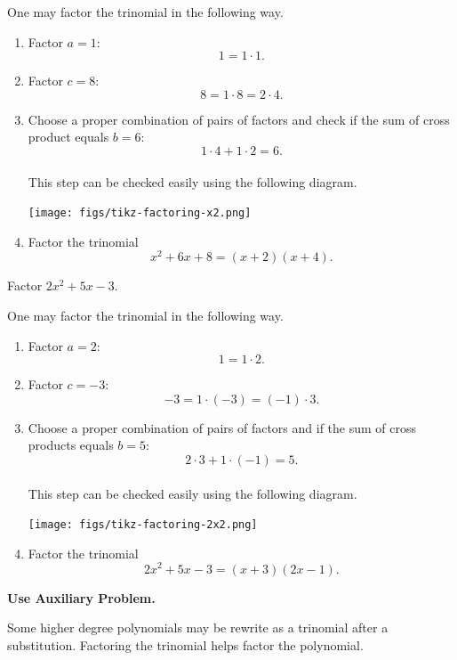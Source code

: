 \documentclass[
  en,11pt]{elegantbook}
\newcommand{\size}[2]{{\fontsize{#1}{0}\selectfont#2}}
\renewenvironment{example}[1][]{
  \refstepcounter{exam}
  \par\noindent\textbf{\color{main}{\examplename} \theexam #1}
  \rmfamily
}{
  \par\ignorespacesafterend
}
\newenvironment{rmdtip}{
	\vspace*{0.5\baselineskip}
	\par\noindent
	\makebox[-3pt][r]{\color{red!90}\size{12}{\HandRight}\,\,}
    \begin{tcolorbox}[
    enhanced,
    title={\textbf{\color{second}Tips}},
    title style={left color=blue!10!green!20!white,right color=yellow!20!blue!20!white},
    colback=cyan!10!white,
    ]
    \sffamily
}{
    \end{tcolorbox}
    \par\ignorespacesafterend
}
\begin{document}
\begin{solution}

One may factor the trinomial in the following way.

\begin{enumerate}
\def\labelenumi{\arabic{enumi}.}
\item
  Factor \(a=1\):
  \[1=1\cdot 1.\]
\item
  Factor \(c=8\):
  \[8=1\cdot 8=2\cdot 4.\]
\item
  Choose a proper combination of pairs of factors and check if the sum of cross product equals \(b=6\):
  \[1\cdot 4+ 1\cdot 2=6.\]\\
  This step can be checked easily using the following diagram.

  {\centering\texttt{[image: figs/tikz-factoring-x2.png]}\par}
\item
  Factor the trinomial
  \[x^2+6x+8=(x+2)(x+4).\]
\end{enumerate}

\end{solution}

\begin{example}
Factor \(2x^2+5x-3\).
\end{example}

\begin{solution}

One may factor the trinomial in the following way.

\begin{enumerate}
\def\labelenumi{\arabic{enumi}.}
\item
  Factor \(a=2\):
  \[1=1\cdot 2.\]
\item
  Factor \(c=-3\):
  \[-3=1\cdot (-3)=(-1)\cdot 3.\]
\item
  Choose a proper combination of pairs of factors and if the sum of cross products equals \(b=5\):\\
  \[2\cdot 3+1\cdot(-1)=5.\]\\
  This step can be checked easily using the following diagram.

  {\centering\texttt{[image: figs/tikz-factoring-2x2.png]}\par}
\item
  Factor the trinomial
  \[2x^2+5x-3=(x+3)(2x-1).\]
\end{enumerate}

\end{solution}

\begin{rmdtip}

\textbf{Use Auxiliary Problem.}

Some higher degree polynomials may be rewrite as a trinomial after a substitution. Factoring the trinomial helps factor the polynomial.

\end{rmdtip}
\end{document}
